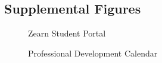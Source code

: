 \documentclass[
  number,
  preprint,
  3p,
  onecolumn]{elsarticle}
\begin{document}
\subsection{Supplemental Figures}\label{sec-supp-fig}

\begin{figure}


\caption{\label{fig-st-portal}Zearn Student Portal}

\end{figure}%

\begin{figure}


\caption{\label{fig-prof-dev}Professional Development Calendar}

\end{figure}%
\end{document}
